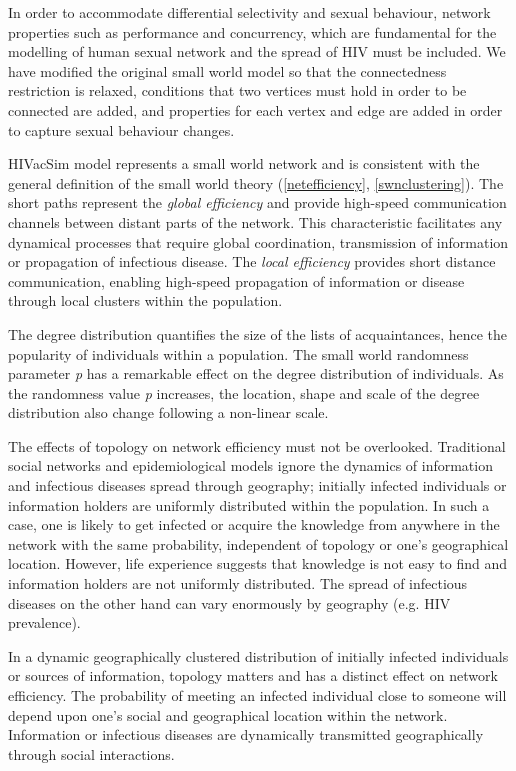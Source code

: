 In order to accommodate differential selectivity and sexual behaviour, network properties
such as performance and concurrency, which are fundamental for the modelling of human
sexual network and the spread of HIV must be included. We have modified the original
small world model so that the connectedness restriction is relaxed, conditions that two
vertices must hold in order to be connected are added, and properties for each vertex and
edge are added in order to capture sexual behaviour changes.

HIVacSim model represents a small world network and is consistent with the general
definition of the small world theory (\ref{netefficiency}, \ref{swnclustering}). The
short paths represent the \emph{global efficiency} and provide high-speed communication
channels between distant parts of the network. This characteristic facilitates any
dynamical processes that require global coordination, transmission of information or
propagation of infectious disease. The \emph{local efficiency} provides short distance
communication, enabling high-speed propagation of information or disease through local
clusters within the population.

The degree distribution quantifies the size of the lists of acquaintances, hence the
popularity of individuals within a population. The small world randomness parameter
\emph{p} has a remarkable effect on the degree distribution of individuals. As the
randomness value \emph{p} increases, the location, shape and scale of the degree
distribution also change following a non-linear scale.

The effects of topology on network efficiency must not be overlooked. Traditional social
networks and epidemiological models ignore the dynamics of information and infectious
diseases spread through geography; initially infected individuals or information holders
are uniformly distributed within the population. In such a case, one is likely to get
infected or acquire the knowledge from anywhere in the network with the same probability,
independent of topology or one's geographical location. However, life experience suggests
that knowledge is not easy to find and information holders are not uniformly distributed.
The spread of infectious diseases on the other hand can vary enormously by geography
(e.g. HIV prevalence).

In a dynamic geographically clustered distribution of initially infected individuals or
sources of information, topology matters and has a distinct effect on network efficiency.
The probability of meeting an infected individual close to someone will depend upon one's
social and geographical location within the network. Information or infectious diseases
are dynamically transmitted geographically through social interactions.


